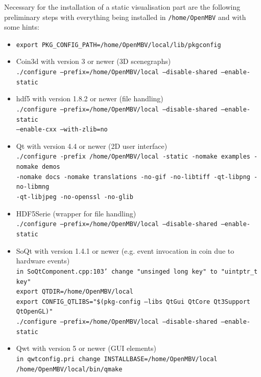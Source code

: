 \subsubsection{\OpenMBV{}}
Necessary for the installation of a static visualisation part are the following preliminary steps with everything being installed in \texttt{/home/OpenMBV} and with some hints:
\begin{itemize}
\item \texttt{export PKG\_CONFIG\_PATH=/home/OpenMBV/local/lib/pkgconfig}
\item Coin3d with version 3 or newer (3D scenegraphs)\\
    \texttt{./configure --prefix=/home/OpenMBV/local --disable-shared --enable-static}
\item hdf5 with version 1.8.2 or newer (file handling)\\
    \texttt{./configure --prefix=/home/OpenMBV/local --disable-shared --enable-static\\ --enable-cxx --with-zlib=no}
\item Qt with version 4.4 or newer (2D user interface)\\
    \texttt{./configure -prefix /home/OpenMBV/local -static -nomake examples -nomake demos\\ -nomake docs -nomake translations -no-gif -no-libtiff -qt-libpng -no-libmng\\ -qt-libjpeg -no-openssl -no-glib}
\item HDF5Serie (wrapper for file handling)\\
    \texttt{./configure --prefix=/home/OpenMBV/local --disable-shared --enable-static}
\item SoQt with version 1.4.1 or newer (e.g. event invocation in coin due to hardware events)\\
    \texttt{in SoQtComponent.cpp:103' change "unsinged long key" to "uintptr\_t key"}\\
    \texttt{export QTDIR=/home/OpenMBV/local}\\
    \texttt{export CONFIG\_QTLIBS="\$(pkg-config --libs QtGui QtCore Qt3Support QtOpenGL)"}\\
    \texttt{./configure --prefix=/home/OpenMBV/local --disable-shared --enable-static}
\item Qwt with version 5 or newer (GUI elements)\\
    \texttt{in qwtconfig.pri change INSTALLBASE=/home/OpenMBV/local}\\
    \texttt{/home/OpenMBV/local/bin/qmake}
\end{itemize}
